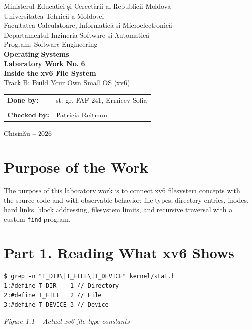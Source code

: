 \documentclass[12pt,a4paper]{article}
\newcommand{\figcap}[1]{\begin{center}\small\textit{#1}\end{center}\vspace{0.4em}}
\begin{document}
\begin{titlepage}
\begin{center}
{\large Ministerul Educației și Cercetării al Republicii Moldova}\\[0.3cm]
{\large Universitatea Tehnică a Moldovei}\\[0.3cm]
{\large Facultatea Calculatoare, Informatică și Microelectronică}\\[0.3cm]
{\large Departamentul Ingineria Software și Automatică}\\[0.3cm]
{\large Program: Software Engineering}\\[2.0cm]
{\Large \textbf{Operating Systems}}\\[0.8cm]
{\LARGE \textbf{Laboratory Work No. 6}}\\[0.5cm]
{\Large \textbf{Inside the xv6 File System}}\\[0.35cm]
{\large Track B: Build Your Own Small OS (xv6)}
\vfill
\begin{flushright}
\begin{tabular}{ll}
\textbf{Done by:} & st. gr. FAF-241, Ermicev Sofia \\
\\
\textbf{Checked by:} & Patricia Reițman
\end{tabular}
\end{flushright}
\vfill
{\large Chișinău -- 2026}
\end{center}
\end{titlepage}
\tableofcontents
\newpage

\section{Purpose of the Work}
The purpose of this laboratory work is to connect xv6 filesystem concepts with the source code and with observable behavior: file types, directory entries, inodes, hard links, block addressing, filesystem limits, and recursive traversal with a custom \texttt{find} program.

\section{Part 1. Reading What xv6 Shows}
\begin{lstlisting}
$ grep -n "T_DIR\|T_FILE\|T_DEVICE" kernel/stat.h
1:#define T_DIR    1 // Directory
2:#define T_FILE   2 // File
3:#define T_DEVICE 3 // Device
\end{lstlisting}
\figcap{Figure 1.1 -- Actual xv6 file-type constants}
\end{document}
